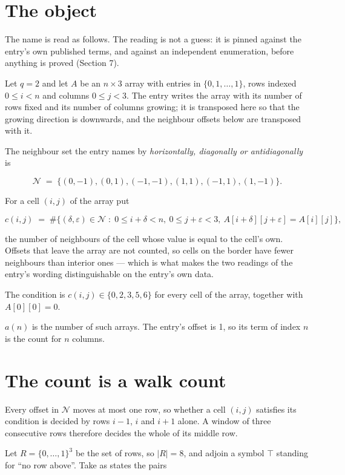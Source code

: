\documentclass[11pt]{article}
\theoremstyle{definition}
\begin{document}
\section{The object}

The name is read as follows. The reading is not a guess: it is pinned against the entry's own published terms, and against an independent enumeration, before anything is proved (Section 7).

Let $q = 2$ and let $A$ be an $n \times 3$ array with entries in $\{0,1,\dots,1\}$, rows indexed $0 \le i < n$ and columns $0 \le j < 3$. The entry writes the array with its number of rows fixed and its number of columns growing; it is transposed here so that the growing direction is downwards, and the neighbour offsets below are transposed with it.

The neighbour set the entry names by {\itshape horizontally, diagonally or antidiagonally} is

\[\mathcal{N} \;=\; \{(0,-1), (0,1), (-1,-1), (1,1), (-1,1), (1,-1)\}.\]

For a cell $(i,j)$ of the array put

\[c(i,j) \;=\; \#\bigl\{(\delta,\varepsilon)\in\mathcal{N} \;:\; 0\le i+\delta<n,\ 0\le j+\varepsilon<3,\ A[i+\delta][j+\varepsilon] = A[i][j]\bigr\},\]

the number of neighbours of the cell whose value is equal to the cell's own. Offsets that leave the array are not counted, so cells on the border have fewer neighbours than interior ones --- which is what makes the two readings of the entry's wording distinguishable on the entry's own data.

The condition is $c(i,j) \in \{0, 2, 3, 5, 6\}$ for every cell of the array, together with $A[0][0]=0$.

$a(n)$ is the number of such arrays. The entry's offset is 1, so its term of index $n$ is the count for $n$ columns.

\section{The count is a walk count}

Every offset in $\mathcal{N}$ moves at most one row, so whether a cell $(i,j)$ satisfies its condition is decided by rows $i-1$, $i$ and $i+1$ alone. A window of three consecutive rows therefore decides the whole of its middle row.

Let $R = \{0,\dots,1\}^{3}$ be the set of rows, so $|R| = 8$, and adjoin a symbol $\top$ standing for ``no row above''. Take as states the pairs
\end{document}
